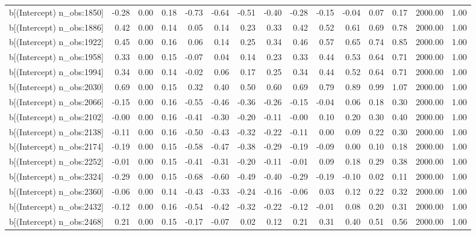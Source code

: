 \begin{table}[ht]
\begin{tabular}{rrrrrrrrrrrrrrr}
  b[(Intercept) n\_obs:1850] & -0.28 & 0.00 & 0.18 & -0.73 & -0.64 & -0.51 & -0.40 & -0.28 & -0.15 & -0.04 & 0.07 & 0.17 & 2000.00 & 1.00 \\ 
  b[(Intercept) n\_obs:1886] & 0.42 & 0.00 & 0.14 & 0.05 & 0.14 & 0.23 & 0.33 & 0.42 & 0.52 & 0.61 & 0.69 & 0.78 & 2000.00 & 1.00 \\ 
  b[(Intercept) n\_obs:1922] & 0.45 & 0.00 & 0.16 & 0.06 & 0.14 & 0.25 & 0.34 & 0.46 & 0.57 & 0.65 & 0.74 & 0.85 & 2000.00 & 1.00 \\ 
  b[(Intercept) n\_obs:1958] & 0.33 & 0.00 & 0.15 & -0.07 & 0.04 & 0.14 & 0.23 & 0.33 & 0.44 & 0.53 & 0.64 & 0.71 & 2000.00 & 1.00 \\ 
  b[(Intercept) n\_obs:1994] & 0.34 & 0.00 & 0.14 & -0.02 & 0.06 & 0.17 & 0.25 & 0.34 & 0.44 & 0.52 & 0.64 & 0.71 & 2000.00 & 1.00 \\ 
  b[(Intercept) n\_obs:2030] & 0.69 & 0.00 & 0.15 & 0.32 & 0.40 & 0.50 & 0.60 & 0.69 & 0.79 & 0.89 & 0.99 & 1.07 & 2000.00 & 1.00 \\ 
  b[(Intercept) n\_obs:2066] & -0.15 & 0.00 & 0.16 & -0.55 & -0.46 & -0.36 & -0.26 & -0.15 & -0.04 & 0.06 & 0.18 & 0.30 & 2000.00 & 1.00 \\ 
  b[(Intercept) n\_obs:2102] & -0.00 & 0.00 & 0.16 & -0.41 & -0.30 & -0.20 & -0.11 & -0.00 & 0.10 & 0.20 & 0.30 & 0.40 & 2000.00 & 1.00 \\ 
  b[(Intercept) n\_obs:2138] & -0.11 & 0.00 & 0.16 & -0.50 & -0.43 & -0.32 & -0.22 & -0.11 & 0.00 & 0.09 & 0.22 & 0.30 & 2000.00 & 1.00 \\ 
  b[(Intercept) n\_obs:2174] & -0.19 & 0.00 & 0.15 & -0.58 & -0.47 & -0.38 & -0.29 & -0.19 & -0.09 & 0.00 & 0.10 & 0.18 & 2000.00 & 1.00 \\ 
  b[(Intercept) n\_obs:2252] & -0.01 & 0.00 & 0.15 & -0.41 & -0.31 & -0.20 & -0.11 & -0.01 & 0.09 & 0.18 & 0.29 & 0.38 & 2000.00 & 1.00 \\ 
  b[(Intercept) n\_obs:2324] & -0.29 & 0.00 & 0.15 & -0.68 & -0.60 & -0.49 & -0.40 & -0.29 & -0.19 & -0.10 & 0.02 & 0.11 & 2000.00 & 1.00 \\ 
  b[(Intercept) n\_obs:2360] & -0.06 & 0.00 & 0.14 & -0.43 & -0.33 & -0.24 & -0.16 & -0.06 & 0.03 & 0.12 & 0.22 & 0.32 & 2000.00 & 1.00 \\ 
  b[(Intercept) n\_obs:2432] & -0.12 & 0.00 & 0.16 & -0.54 & -0.42 & -0.32 & -0.22 & -0.12 & -0.01 & 0.08 & 0.20 & 0.31 & 2000.00 & 1.00 \\ 
  b[(Intercept) n\_obs:2468] & 0.21 & 0.00 & 0.15 & -0.17 & -0.07 & 0.02 & 0.12 & 0.21 & 0.31 & 0.40 & 0.51 & 0.56 & 2000.00 & 1.00 \\ 

\end{tabular}
\end{table}
